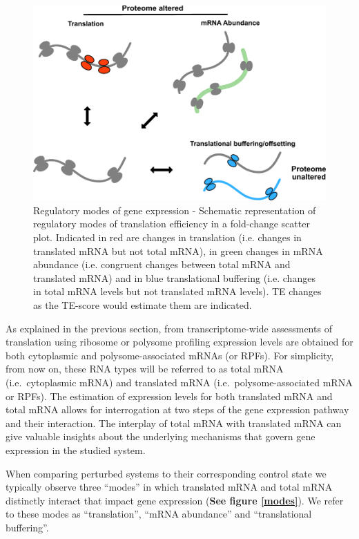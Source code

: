 \documentclass[12pt,openany]{book}
\begin{document}
\begin{figure}
  \includegraphics{./figures/geneModes_MRNA.pdf}
  \caption{Regulatory modes of gene expression - Schematic representation of regulatory modes of translation efficiency in a fold-change scatter plot. Indicated in red are changes in translation (i.e. changes in translated mRNA but not total mRNA), in green changes in mRNA abundance (i.e. congruent changes between total mRNA and translated mRNA) and in blue translational buffering (i.e. changes in total mRNA levels but not translated mRNA levels). TE changes as the TE-score would estimate them are indicated.\label{fig:modes}}
\end{figure}

As explained in the previous section, from transcriptome-wide
assessments of translation using ribosome or polysome profiling
expression levels are obtained for both cytoplasmic and
polysome-associated mRNAs (or RPFs). For simplicity, from now on, these
RNA types will be referred to as total mRNA (i.e.~cytoplasmic mRNA) and
translated mRNA (i.e.~polysome-associated mRNA or RPFs). The estimation
of expression levels for both translated mRNA and total mRNA allows for
interrogation at two steps of the gene expression pathway and their
interaction. The interplay of total mRNA with translated mRNA can give
valuable insights about the underlying mechanisms that govern gene
expression in the studied system.

When comparing perturbed systems to their corresponding control state we
typically observe three ``modes'' in which translated mRNA and total
mRNA distinctly interact that impact gene expression (\textbf{See figure
\ref{modes}}). We refer to these modes as ``translation'', ``mRNA
abundance'' and ``translational buffering''.
\end{document}
